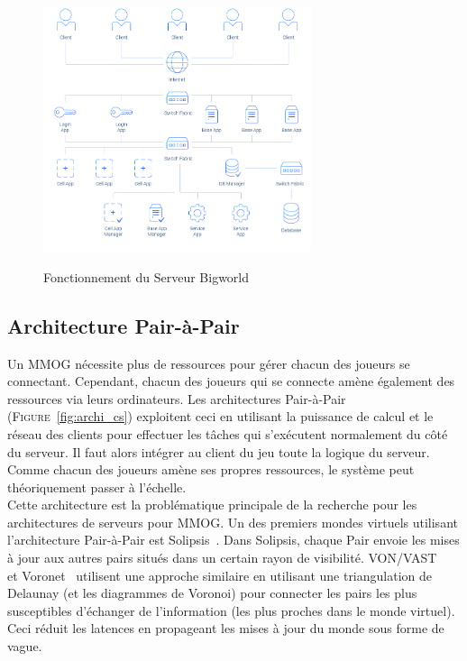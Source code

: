 \begin{figure}[b!]
	\centering
	\includegraphics[width=0.7\textwidth]{bigworld.png}
	\\[0.2cm]
	\caption{Fonctionnement du Serveur Bigworld~\cite{bigworld}}
	\label{fig:bigworld}
\end{figure}

\subsection{Architecture Pair-à-Pair}
Un MMOG nécessite plus de ressources pour gérer chacun des joueurs se connectant. Cependant, chacun des joueurs qui se connecte amène également des ressources via leurs ordinateurs. Les architectures Pair-à-Pair (\textsc{Figure}~\ref{fig:archi_cs}) exploitent ceci en utilisant la puissance de calcul et le réseau des clients pour effectuer les tâches qui s'exécutent normalement du côté du serveur. Il faut alors intégrer au client du jeu toute la logique du serveur. Comme chacun des joueurs amène ses propres ressources, le système peut théoriquement passer à l'échelle.\\

Cette architecture est la problématique principale de la recherche pour les architectures de serveurs pour MMOG. Un des premiers mondes virtuels utilisant l'architecture Pair-à-Pair est Solipsis~\cite{solipsis}. Dans Solipsis, chaque Pair envoie les mises à jour aux autres pairs situés dans un certain rayon de visibilité. VON/VAST~\cite{VON}~\cite{VAST} et Voronet~\cite{voronet} utilisent une approche similaire en utilisant une triangulation de Delaunay (et les diagrammes de Voronoi) pour connecter les pairs les plus susceptibles d'échanger de l'information (les plus proches dans le monde virtuel). Ceci réduit les latences en propageant les mises à jour du monde sous forme de vague.\\

